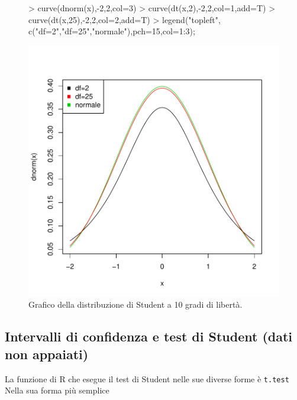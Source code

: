 \documentclass[onecolumn,12pt]{book}
\begin{document}
\begin{figure}[htbp]
\begin{center}
\begin{Schunk}
\begin{Sinput}
> curve(dnorm(x),-2,2,col=3)
> curve(dt(x,2),-2,2,col=1,add=T)
> curve(dt(x,25),-2,2,col=2,add=T)
> legend("topleft", c("df=2","df=25","normale"),pch=15,col=1:3);
\end{Sinput}
\end{Schunk}
\includegraphics{RbookParte2-080}
\caption{Grafico della distribuzione di Student a 10 gradi di libert\`a. }
\label{fig:graficostudent}
\end{center}
\end{figure}
 \subsection
{Intervalli di confidenza e test di Student (dati non appaiati)}
La funzione di
\textsf{R} che esegue il test di Student nelle sue diverse forme \`e  \texttt{t.test}   Nella sua forma pi\`u semplice
\end{document}
